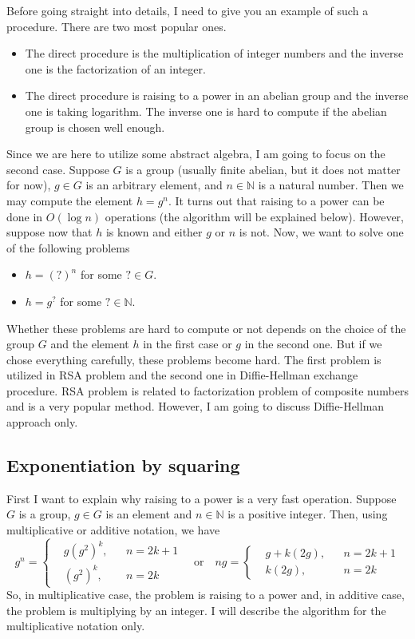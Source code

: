 Before going straight into details, I need to give you an example of such a procedure. There are two most popular ones.
\begin{itemize}
\item The direct procedure is the multiplication of integer numbers and the inverse one is the factorization of an integer.

\item  The direct procedure is raising to a power in an abelian group and the inverse one is taking logarithm. The inverse one is hard to compute if the abelian group is chosen well enough.
\end{itemize}
Since we are here to utilize some abstract algebra, I am going to focus on the second case. Suppose $G$ is a group (usually finite abelian, but it does not matter for now), $g\in G$ is an arbitrary element, and $n\in \mathbb N$ is a natural number. Then we may compute the element $h = g^n$. It turns out that raising to a power can be done in $O(\log n)$ operations (the algorithm will be explained below). However, suppose now that $h$ is known and either $g$ or $n$ is not. Now, we want to solve one of the following problems
\begin{itemize}
\item $h = (?)^n$ for some $?\in G$.
\item $h = g^?$ for some $?\in \mathbb N$.
\end{itemize}
Whether these problems are hard to compute or not depends on the choice of the group $G$ and the element $h$ in the first case or $g$ in the second one. But if we chose everything carefully, these problems become hard. The first problem is utilized in RSA problem and the second one in Diffie-Hellman exchange procedure. RSA problem is related to factorization problem of composite numbers and is a very popular method. However, I am going to discuss Diffie-Hellman approach only.


\subsection{Exponentiation by squaring}

First I want to explain why raising to a power is a very fast operation. Suppose $G$ is a group, $g\in G$ is an element and $n\in \mathbb N$ is a positive integer. Then, using multiplicative or additive notation, we have
\[
g^n = 
\left\{
\begin{aligned}
&g (g^2)^{k}, & &n = 2k + 1\\
&(g^2)^k, & &n = 2k
\end{aligned}
\right.
\quad\text{or}\quad
ng = 
\left\{
\begin{aligned}
&g + k(2g), & &n = 2k + 1\\
&k (2g), & &n = 2k
\end{aligned}
\right.
\]
So, in multiplicative case, the problem is raising to a power and, in additive case, the problem is multiplying by an integer. I will describe the algorithm for the multiplicative notation only.

